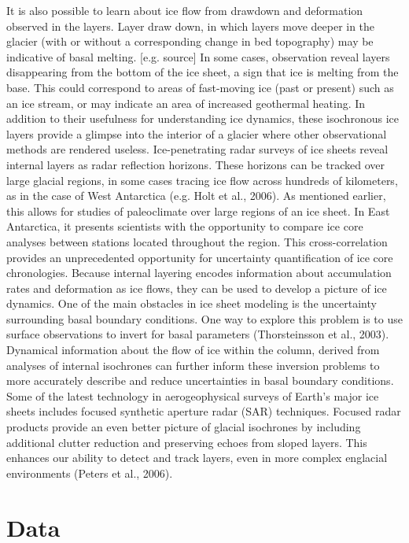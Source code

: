\documentclass[draft,jgrga]{agutex}
\begin{document}
	It is also possible to learn about ice flow from drawdown and deformation observed in the layers. Layer draw down, in which layers move deeper in the glacier (with or without a corresponding change in bed topography) may be indicative of basal melting. [e.g. source] In some cases, observation reveal layers disappearing from the bottom of the ice sheet, a sign that ice is melting from the base. This could correspond to areas of fast-moving ice (past or present) such as an ice stream, or may indicate an area of increased geothermal heating.	
	In addition to their usefulness for understanding ice dynamics, these isochronous ice layers provide a glimpse into the interior of a glacier where other observational methods are rendered useless. Ice-penetrating radar surveys of ice sheets reveal internal layers as radar reflection horizons. These horizons can be tracked over large glacial regions, in some cases tracing ice flow across hundreds of kilometers, as in the case of West Antarctica (e.g. Holt et al., 2006). As mentioned earlier, this allows for studies of paleoclimate over large regions of an ice sheet. In East Antarctica, it presents scientists with the opportunity to compare ice core analyses between stations located throughout the region. This cross-correlation provides an unprecedented opportunity for uncertainty quantification of ice core chronologies. 
Because internal layering encodes information about accumulation rates and deformation as ice flows, they can be used to develop a picture of ice dynamics. One of the main obstacles in ice sheet modeling is the uncertainty surrounding basal boundary conditions. One way to explore this problem is to use surface observations to invert for basal parameters (Thorsteinsson et al., 2003). Dynamical information about the flow of ice within the column, derived from analyses of internal isochrones can further inform these inversion problems to more accurately describe and reduce uncertainties in basal boundary conditions. 
Some of the latest technology in aerogeophysical surveys of Earth’s major ice sheets includes focused synthetic aperture radar (SAR) techniques. Focused radar products provide an even better picture of glacial isochrones by including additional clutter reduction and preserving echoes from sloped layers. This enhances our ability to detect and track layers, even in more complex englacial environments (Peters et al., 2006). 




\section{Data}
\end{document}
